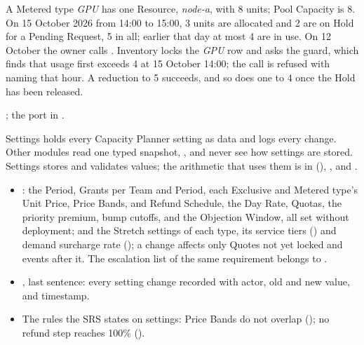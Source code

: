 A Metered type \emph{GPU} has one Resource, \emph{node-a}, with 8 units; Pool Capacity is 8. On 15 October 2026 from 14:00 to 15:00, 3 units are allocated and 2 are on Hold for a Pending Request, 5 in all; earlier that day at most 4 are in use. On 12 October the owner calls . Inventory locks the \emph{GPU} row and asks the guard, which finds that usage first exceeds 4 at 15 October 14:00; the call is refused with  naming that hour. A reduction to 5 succeeds, and so does one to 4 once the Hold has been released.

; the  port in .


Settings holds every Capacity Planner setting as data and logs every change. Other modules read one typed snapshot, , and never see how settings are stored. Settings stores and validates values; the arithmetic that uses them is in  (), , and .

\begin{itemize}
\item {}: the Period, Grants per Team and Period, each Exclusive and Metered type's Unit Price, Price Bands, and Refund Schedule, the Day Rate, Quotas, the priority premium, bump cutoffs, and the Objection Window, all set without deployment; and the Stretch settings of each type, its service tiers () and demand surcharge rate (); a change affects only Quotes not yet locked and events after it. The escalation list of the same requirement belongs to .
\item {}, last sentence: every setting change recorded with actor, old and new value, and timestamp.
\item The rules the SRS states on settings: Price Bands do not overlap (); no refund step reaches 100\% ().
\end{itemize}


